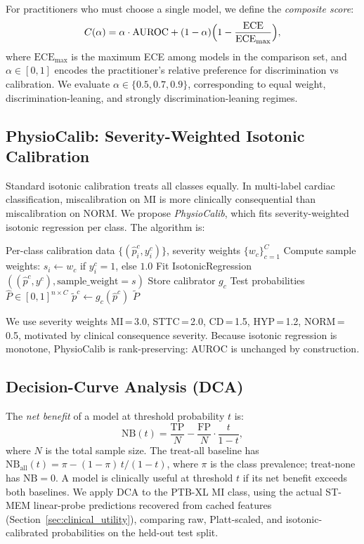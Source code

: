 For practitioners who must choose a single model, we define the \emph{composite score}:
\[
  C(\alpha) = \alpha \cdot \mathrm{AUROC}
            + (1-\alpha)\Bigl(1 - \frac{\mathrm{ECE}}{\mathrm{ECE}_{\max}}\Bigr),
\]
where $\mathrm{ECE}_{\max}$ is the maximum ECE among models in the comparison set, and
$\alpha \in [0,1]$ encodes the practitioner's relative preference for discrimination vs
calibration. We evaluate $\alpha \in \{0.5, 0.7, 0.9\}$, corresponding to equal weight,
discrimination-leaning, and strongly discrimination-leaning regimes.

\subsection{PhysioCalib: Severity-Weighted Isotonic Calibration}
\label{sec:physiocalib}

Standard isotonic calibration treats all classes equally. In multi-label cardiac
classification, miscalibration on MI is more clinically consequential than miscalibration
on NORM. We propose \emph{PhysioCalib}, which fits severity-weighted isotonic regression
per class. The algorithm is:

\begin{algorithm}[H]
\caption{PhysioCalib}
\label{alg:physiocalib}
\begin{algorithmic}[1]
\Require Per-class calibration data $\{(\hat{p}_i^c, y_i^c)\}$,
         severity weights $\{w_c\}_{c=1}^C$
  \State Compute sample weights: $s_i \gets w_c$ if $y_i^c = 1$, else $1.0$
  \State Fit IsotonicRegression$((\hat{p}^c, y^c), \mathrm{sample\_weight}=s)$
  \State Store calibrator $g_c$
\EndFor
\Require Test probabilities $\hat{P} \in [0,1]^{n \times C}$
  \State $\tilde{p}^c \gets g_c(\hat{p}^c)$
\EndFor
\State \Return $\tilde{P}$
\end{algorithmic}
\end{algorithm}

We use severity weights MI\,=\,3.0, STTC\,=\,2.0, CD\,=\,1.5, HYP\,=\,1.2, NORM\,=\,0.5,
motivated by clinical consequence severity. Because isotonic regression is monotone,
PhysioCalib is rank-preserving: AUROC is unchanged by construction.

\subsection{Decision-Curve Analysis (DCA)}
\label{sec:dca}

The \emph{net benefit} of a model at threshold probability $t$ is:
\[
  \mathrm{NB}(t) = \frac{\mathrm{TP}}{N} - \frac{\mathrm{FP}}{N}\cdot\frac{t}{1-t},
\]
where $N$ is the total sample size. The treat-all baseline has
$\mathrm{NB}_{\mathrm{all}}(t) = \pi - (1-\pi)\,t/(1-t)$, where $\pi$ is
the class prevalence; treat-none has $\mathrm{NB} = 0$. A model is clinically useful at
threshold $t$ if its net benefit exceeds both baselines. We apply DCA to the PTB-XL MI
class, using the actual ST-MEM linear-probe predictions recovered from cached features
(Section~\ref{sec:clinical_utility}), comparing raw, Platt-scaled, and isotonic-calibrated
probabilities on the held-out test split.
